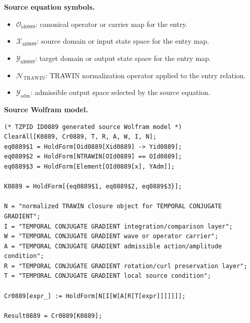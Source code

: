 \begin{minipage}[t]{0.49\linewidth}
\begingroup
\small
\raggedright
\textbf{Source equation symbols.}\par
\begin{itemize}[leftmargin=1.35em,itemsep=1pt,topsep=1pt,parsep=0pt]
    \item $\mathcal{O}_{\mathrm{id0889}}$: canonical operator or carrier map for the entry.
    \item $\mathcal{X}_{\mathrm{id0889}}$: source domain or input state space for the entry map.
    \item $\mathcal{Y}_{\mathrm{id0889}}$: target domain or output state space for the entry map.
    \item $\mathcal{N}_{\mathrm{TRAWIN}}$: TRAWIN normalization operator applied to the entry relation.
    \item $\mathcal{Y}_{\mathrm{adm}}$: admissible output space selected by the source equation.
\end{itemize}
\endgroup
\end{minipage}\hfill
\begin{minipage}[t]{0.47\linewidth}
\begingroup
\scriptsize
\raggedright
\textbf{Source Wolfram model.}\par
\begin{Verbatim}[fontsize=\tiny,breaklines=true,breakanywhere=true]
(* TZPID ID0889 generated source Wolfram model *)
ClearAll[K0889, Cr0889, T, R, A, W, I, N];
eq0889$1 = HoldForm[Oid0889[Xid0889] -> Yid0889];
eq0889$2 = HoldForm[NTRAWIN[OId0889] == OId0889];
eq0889$3 = HoldForm[Element[OId0889[x], YAdm]];

K0889 = HoldForm[{eq0889$1, eq0889$2, eq0889$3}];

N = "normalized TRAWIN closure object for TEMPORAL CONJUGATE GRADIENT";
I = "TEMPORAL CONJUGATE GRADIENT integration/comparison layer";
W = "TEMPORAL CONJUGATE GRADIENT wave or operator carrier";
A = "TEMPORAL CONJUGATE GRADIENT admissible action/amplitude condition";
R = "TEMPORAL CONJUGATE GRADIENT rotation/curl preservation layer";
T = "TEMPORAL CONJUGATE GRADIENT local source condition";

Cr0889[expr_] := HoldForm[N[I[W[A[R[T[expr]]]]]]];

Result0889 = Cr0889[K0889];
\end{Verbatim}
\endgroup
\end{minipage}

